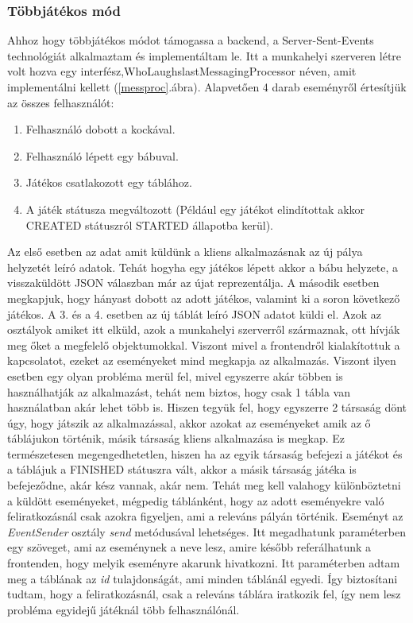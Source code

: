\documentclass[a4paper,twoside]{article}
\begin{document}
\subsubsection{Többjátékos mód}
Ahhoz hogy többjátékos módot támogassa a backend, a Server-Sent-Events technológiát alkalmaztam és implementáltam le. Itt a munkahelyi szerveren létre volt hozva egy interfész,WhoLaughslastMessagingProcessor néven, amit implementálni kellett (\ref{messproc}.ábra). Alapvetően 4 darab eseményről értesítjük az összes felhasználót: \begin{enumerate}
	\item Felhasználó dobott a kockával.
	\item Felhasználó lépett egy bábuval.
	\item Játékos csatlakozott egy táblához.
	\item A játék státusza megváltozott (Például egy játékot elindítottak akkor CREATED státuszról STARTED állapotba kerül).
\end{enumerate}
Az első esetben az adat amit küldünk a kliens alkalmazásnak az új pálya helyzetét leíró adatok. Tehát hogyha egy játékos lépett akkor a bábu helyzete, a visszaküldött JSON válaszban már az újat reprezentálja. A második esetben megkapjuk, hogy hányast dobott az adott játékos, valamint ki a soron következő játékos. A 3. és a 4. esetben az új táblát leíró JSON adatot küldi el. Azok az osztályok amiket itt elküld, azok a munkahelyi szerverről származnak, ott hívják meg őket a megfelelő objektumokkal. Viszont mivel a frontendről kialakítottuk a kapcsolatot, ezeket az eseményeket mind megkapja az alkalmazás. Viszont ilyen esetben egy olyan probléma merül fel, mivel egyszerre akár többen is használhatják az alkalmazást, tehát nem biztos, hogy csak 1 tábla van használatban akár lehet több is. Hiszen tegyük fel, hogy egyszerre 2 társaság dönt úgy, hogy játszik az alkalmazással, akkor azokat az eseményeket amik az ő táblájukon történik, másik társaság kliens alkalmazása is megkap. Ez természetesen megengedhetetlen, hiszen ha az egyik társaság befejezi a játékot és a táblájuk a FINISHED státuszra vált, akkor a másik társaság játéka is befejeződne, akár kész vannak, akár nem. Tehát meg kell valahogy különböztetni a küldött eseményeket, mégpedig táblánként, hogy az adott eseményekre való feliratkozásnál csak azokra figyeljen, ami a releváns pályán történik. Eseményt az \textit{EventSender} osztály \textit{send} metódusával lehetséges. Itt megadhatunk paraméterben egy szöveget, ami az eseménynek a neve lesz, amire később referálhatunk a frontenden, hogy melyik eseményre akarunk hivatkozni. Itt paraméterben adtam meg a táblának az \textit{id} tulajdonságát, ami minden táblánál egyedi. Így biztosítani tudtam, hogy a feliratkozásnál, csak a releváns táblára iratkozik fel, így nem lesz probléma egyidejű játéknál több felhasználónál. 
\end{document}
